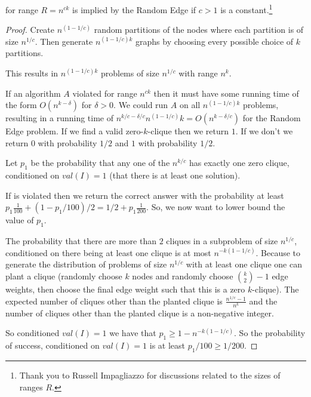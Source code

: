\begin{theorem}\label{thm:rangeExtendThm}
\Strongzkc for range $R=n^{c k}$ is implied by the Random Edge \RandomZKC if $c>1$ is a constant.\footnote{Thank you to Russell Impagliazzo for discussions related to the sizes of ranges $R$.}
\end{theorem}
\begin{proof}
	Create $n^{(1-1/c)}$ random partitions of the nodes where each partition is of size $n^{1/c}$. Then generate $n^{(1-1/c)k}$ graphs by choosing every possible choice of $k$ partitions.
	
	This results in $n^{(1-1/c)k}$ problems of size  $n^{1/c}$ with range $n^k$. 
	
	If an algorithm $A$ violated \Strongzkc for range $n^{c k}$ then it must have some running time of the form $O(n^{k-\delta})$ for $\delta > 0$. We could run $A$ on all $n^{(1-1/c)k}$ problems, resulting in a running time of $n^{k/c-\delta/c}n^{(1-1/c)}k = O(n^{k-\delta/c})$ for the Random Edge problem. If we find a valid zero-$k$-clique then we return $1$. If we don't we return $0$ with probability $1/2$ and $1$ with probability $1/2$.
	
	Let $p_1$ be the probability that any one of the $n^{k/c}$ has exactly one zero clique, conditioned on $val(I)=1$ (that there is at least one solution). 
	
	If \Strongzkc is violated then we return the correct answer with the probability at least $p_1 \frac{1}{100} + (1-p_1/100)/2 = 1/2+p_1\frac{1}{200}$. So, we now want to lower bound the value of $p_1$.
	
	The probability that there are more than $2$ cliques in a subproblem of size  $n^{1/c}$, conditioned on there being at least one clique is at most $n^{-k(1-1/c)}$. Because to generate the distribution of problems of size $n^{1/c}$ with at least one clique one can plant a clique (randomly choose $k$ nodes and randomly choose $\binom{k}{2}-1$ edge weights, then choose the final edge weight such that this is a zero $k$-clique). The expected number of cliques other than the planted clique is $\frac{n^{1/c}-1}{n^k}$ and the number of cliques other than the planted clique is a non-negative integer.
	
	So conditioned $val(I)=1$ we have that $p_1\geq 1-n^{-k(1-1/c)}$. So the probability of success, conditioned on $val(I)=1$  is at least $p_1/100 \geq 1/200$.
\end{proof}
